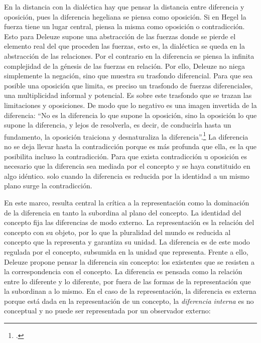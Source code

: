 En la distancia con la dialéctica hay que pensar la distancia entre
diferencia y oposición, pues la diferencia hegeliana se piensa como
oposición. Si en Hegel la fuerza tiene un lugar central, piensa la misma
como oposición o contradicción. Esto para Deleuze supone una abstracción
de las fuerzas donde se pierde el elemento real del que proceden las
fuerzas, esto es, la dialéctica se queda en la abstracción de las
relaciones. Por el contrario en la diferencia se piensa la infinita
complejidad de la génesis de las fuerzas en relación. Por ello, Deleuze
no niega simplemente la negación, sino que muestra su trasfondo
diferencial. Para que sea posible una oposición que limita, es preciso
un trasfondo de fuerzas diferenciales, una multiplicidad informal y
potencial. Es sobre este trasfondo que se trazan las limitaciones y
oposiciones. De modo que lo negativo es una imagen invertida de la
diferencia: \enquote{No es la diferencia lo que supone la oposición, sino la
oposición lo que supone la diferencia, y lejos de resolverla, es decir,
de conducirla hasta un fundamento, la oposición traiciona y
desnaturaliza la diferencia}.\footcite[94]{deleuze2005a} La diferencia no se deja
llevar hasta la contradicción porque es más profunda que ella, es la que
posibilita incluso la contradicción. Para que exista contradicción u
oposición es necesario que la diferencia sea mediada por el concepto y
se haya constituido en algo idéntico. solo cuando la diferencia es
reducida por la identidad a un mismo plano surge la contradicción.

En este marco, resulta central la crítica a la representación como la
dominación de la diferencia en tanto la subordina al plano del concepto.
La identidad del concepto fija las diferencias de modo externo. La
representación es la relación del concepto con su objeto, por lo que la
pluralidad del mundo es reducida al concepto que la representa y
garantiza su unidad. La diferencia es de este modo regulada por el
concepto, subsumida en la unidad que representa. Frente a ello, Deleuze
propone pensar la diferencia sin concepto: los existentes que se
resisten a la correspondencia con el concepto. La diferencia es pensada
como la relación entre lo diferente y lo diferente, por fuera de las
formas de la representación que la subordinan a lo mismo. En el caso de
la representación, la diferencia es externa porque está dada en la
representación de un concepto, la \emph{diferencia interna} es no
conceptual y no puede ser representada por un observador externo:

